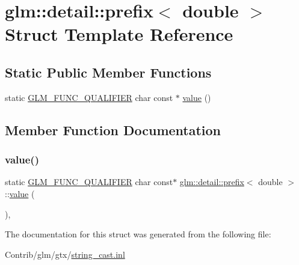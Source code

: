 \hypertarget{structglm_1_1detail_1_1prefix_3_01double_01_4}{}\section{glm\+:\+:detail\+:\+:prefix$<$ double $>$ Struct Template Reference}
\label{structglm_1_1detail_1_1prefix_3_01double_01_4}
\subsection*{Static Public Member Functions}
\begin{DoxyCompactItemize}
\item 
static \mbox{\hyperlink{setup_8hpp_a33fdea6f91c5f834105f7415e2a64407}{G\+L\+M\+\_\+\+F\+U\+N\+C\+\_\+\+Q\+U\+A\+L\+I\+F\+I\+ER}} char const  $\ast$ \mbox{\hyperlink{structglm_1_1detail_1_1prefix_3_01double_01_4_a39aa4646d7de33a2382c92db849d6eb5}{value}} ()
\end{DoxyCompactItemize}


\subsection{Member Function Documentation}
\mbox{\label{structglm_1_1detail_1_1prefix_3_01double_01_4_a39aa4646d7de33a2382c92db849d6eb5}} 
\subsubsection{\texorpdfstring{value()}{value()}}
{\footnotesize\ttfamily static \mbox{\hyperlink{setup_8hpp_a33fdea6f91c5f834105f7415e2a64407}{G\+L\+M\+\_\+\+F\+U\+N\+C\+\_\+\+Q\+U\+A\+L\+I\+F\+I\+ER}} char const$\ast$ \mbox{\hyperlink{structglm_1_1detail_1_1prefix}{glm\+::detail\+::prefix}}$<$ double $>$\+::\mbox{\hyperlink{_s_d_l__opengl__glext_8h_a8ad81492d410ff2ac11f754f4042150f}{value}} (\begin{DoxyParamCaption}{ }\end{DoxyParamCaption})\hspace{0.3cm}{\ttfamily [inline]}, {\ttfamily [static]}}



The documentation for this struct was generated from the following file\+:\begin{DoxyCompactItemize}
\item 
Contrib/glm/gtx/\mbox{\hyperlink{string__cast_8inl}{string\+\_\+cast.\+inl}}\end{DoxyCompactItemize}

